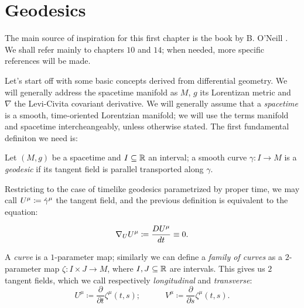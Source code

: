 \section{Geodesics}\label{sec:geodesics}

The main source of inspiration for this first chapter is the book by B. O'Neill \cite{o1983semi}. We shall refer mainly to chapters \(10\) and \(14\); when needed, more specific references will be made.

Let's start off with some basic concepts derived from differential geometry. We will generally address the spacetime manifold as \(M\), \(g\) its Lorentizan metric and \(\nabla\) the Levi-Civita covariant derivative.
We will generally assume that a \emph{spacetime} is a smooth, time-oriented Lorentzian manifold; we will use the terms manifold and spacetime intercheangeably, unless otherwise stated.
The first fundamental definiton we need is:
\begin{definition}
	Let \((M, g)\) be a spacetime and \(I \subseteq {\mathbb{R}}\) an interval; a smooth curve \(\gamma : I \rightarrow M\) is a \emph{geodesic} if its tangent field is parallel transported along \(\gamma\).\\
\end{definition}    


Restricting to the case of timelike geodesics parametrized by proper time, we may call \(U\indices{^{\mu}} \coloneqq \dot{\gamma}^{\mu}\) the tangent field, and the previous definition is equivalent to the equation:

\begin{equation}
\label{eq:tang-trans-fields}
\nabla_U U^{\mu} \coloneqq \frac{D\tensor{U}{^\mu} }{dt} \equiv 0.
\end{equation}



A \emph{curve} is a \(1\)-parameter map; similarly we can define a \emph{family of curves} as a \(2\)-parameter map \(\zeta: I \times J \rightarrow M\), where \(I, J \subseteq {\mathbb{R}}\) are intervals. This gives us \(2\) tangent fields, which we call respectively \emph{longitudinal} and \emph{transverse}:
\[
U^{\mu} \coloneqq \frac{\partial}{\partial t} \zeta^{\mu}(t,s); \quad \quad \quad 
V^{\mu} \coloneqq \frac{\partial}{\partial s} \zeta^{\mu}(t,s). 
\]

